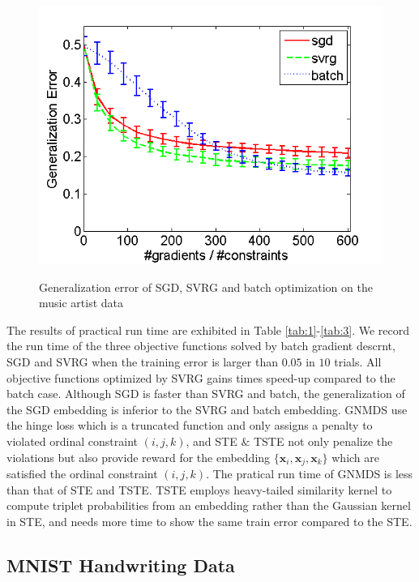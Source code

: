 \documentclass[letterpaper]{article}
\begin{document}
\begin{figure}
{				\includegraphics[scale=0.33]{Music_TSTE_200_test.png}
			}
			\caption{Generalization error of SGD, SVRG and batch optimization on the music artist data}
			\label{fig:3} %
		\end{figure}

		The results of practical run time are exhibited in Table \ref{tab:1}-\ref{tab:3}. We record the run time of the three objective functions solved by batch gradient descrnt, SGD and  SVRG when the training error is larger than $0.05$ in $10$ trials. All objective functions optimized by SVRG gains times speed-up compared to the batch case. Although SGD is faster than SVRG and batch, the generalization of the SGD embedding is inferior to the SVRG and batch embedding. GNMDS use the hinge loss which is a truncated function and only assigns a penalty to violated ordinal constraint $(i,j,k)$, and STE $\&$ TSTE not only penalize the violations but also provide reward for the embedding $\{\mathbf{x}_i, \mathbf{x}_j, \mathbf{x}_k\}$ which are satisfied the ordinal constraint $(i,j,k)$. The pratical run time of GNMDS is less than that of STE and TSTE. TSTE employs heavy-tailed similarity kernel to compute triplet probabilities from an embedding rather than the Gaussian kernel in STE, and needs more time to show the same train error compared to the STE.
		
		\subsection{MNIST Handwriting Data}
\end{document}
